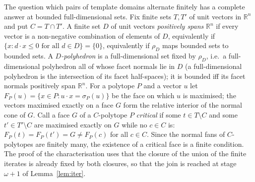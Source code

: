 \documentclass[11pt]{amsart}
\theoremstyle{definition}
\begin{document}
The question which pairs of template domains alternate finitely has a
complete answer at bounded full-dimensional sets. Fix finite sets
$T,T'$ of unit vectors in $\mathbb R^n$ and put $C=T\cap T'$. A finite
set $D$ of unit vectors \emph{positively spans} $\mathbb R^n$ if every
vector is a non-negative combination of elements of $D$, equivalently if
$\{x:d\cdot x\le0\text{ for all }d\in D\}=\{0\}$, equivalently if
$\rho_D$ maps bounded sets to bounded sets. A \emph{$D$-polyhedron} is a
full-dimensional set fixed by $\rho_D$, i.e.\ a full-dimensional
polyhedron all of whose facet normals lie in $D$ (a full-dimensional
polyhedron is the intersection of its facet half-spaces); it is bounded
iff its facet normals positively span $\mathbb R^n$. For a polytope $P$
and a vector $u$ let $F_P(u)=\{x\in P:u\cdot x=\sigma_P(u)\}$ be the face
on which $u$ is maximised; the vectors maximised exactly on a face $G$
form the relative interior of the normal cone of $G$. Call a face $G$ of
a $C$-polytope $P$ \emph{critical} if some $t\in T\setminus C$ and some
$t'\in T'\setminus C$ are maximised exactly on $G$ while no $c\in C$ is:
$F_P(t)=F_P(t')=G\ne F_P(c)$ for all $c\in C$. Since the normal fans of
$C$-polytopes are finitely many, the existence of a critical face is a
finite condition. The proof of the characterisation uses that the
closure of the union of the finite iterates is already fixed by both
closures, so that the join is reached at stage $\omega+1$ of
Lemma~\ref{lem:iter}.
\end{document}

